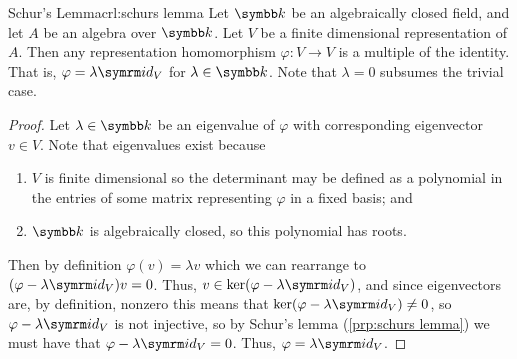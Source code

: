 \begin{crl}{Schur's Lemma}{crl:schurs lemma}
    Let \(\field\) be an algebraically closed field, and let \(A\) be an algebra over \(\field\).
    Let \(V\) be a finite dimensional representation of \(A\).
    Then any representation homomorphism \(\varphi \colon V \to V\) is a multiple of the identity.
    That is, \(\varphi = \lambda \id_V\) for \(\lambda \in \field\).
    Note that \(\lambda = 0\) subsumes the trivial case.
    \begin{proof}
        Let \(\lambda \in \field\) be an eigenvalue of \(\varphi\) with corresponding eigenvector \(v \in V\).
        Note that eigenvalues exist because
        \begin{enumerate}[label={\alph*)}]
            \item \(V\) is finite dimensional so the determinant may be defined as a polynomial in the entries of some matrix representing \(\varphi\) in a fixed basis; and
            \item \(\field\) is algebraically closed, so this polynomial has roots.
        \end{enumerate}
        Then by definition \(\varphi(v) = \lambda v\) which we can rearrange to \((\varphi - \lambda \id_V) v = 0\).
        Thus, \(v \in \ker(\varphi - \lambda \id_V)\), and since eigenvectors are, by definition, nonzero this means that \(\ker(\varphi - \lambda \id_V) \ne 0\), so \(\varphi - \lambda \id_V\) is not injective, so by Schur's lemma (\cref{prp:schurs lemma}) we must have that \(\varphi - \lambda \id_V = 0\).
        Thus, \(\varphi = \lambda \id_V\).
    \end{proof}
\end{crl}


